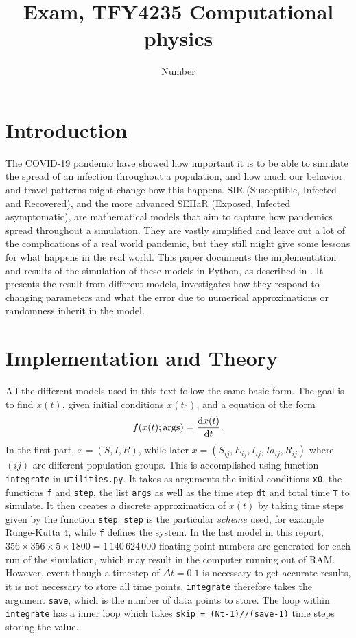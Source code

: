 \documentclass{article}
\title{Exam, TFY4235 Computational physics}
\author{Number}
\date{}
\begin{document}
    \maketitle
    \section*{Introduction}
    The COVID-19 pandemic have showed how important it is to be able to simulate the spread of an infection throughout a population, and how much our behavior and travel patterns might change how this happens.
    SIR (Susceptible, Infected and Recovered), and the more advanced SEIIaR (Exposed, Infected asymptomatic), are mathematical models that aim to capture how pandemics spread throughout a simulation.
    They are vastly simplified and leave out a lot of the complications of a real world pandemic, but they still might give some lessons for what happens in the real world.
    This paper documents the implementation and results of the simulation of these models in Python, as described in \cite{exam}.
    It presents the result from different models, investigates how they respond to changing parameters and what the error due to numerical approximations or randomness inherit in the model.

    \section*{Implementation and Theory}
    All the different models used in this text follow the same basic form. 
    The goal is to find $x(t)$, given initial conditions $x(t_0)$, and a equation of the form
    \begin{equation*}
        f(x(t); \mathrm{args}) = \dv{x(t)}{t}.
    \end{equation*}
    In the first part, $x = (S, I, R)$, while later $x = (S_{ij}, E_{ij}, I_{ij}, Ia_{ij}, R_{ij})$ where $(ij)$ are different population groups. 
    This is accomplished using function \verb|integrate| in \verb|utilities.py|. 
    It takes as arguments the initial conditions \verb|x0|, the functions \verb|f| and \verb|step|, the list \verb|args| as well as the time step \verb|dt| and total time \verb|T| to simulate. 
    It then creates a discrete approximation of $x(t)$ by taking time steps given by the function \verb|step|. 
    \verb|step| is the particular \emph{scheme} used, for example Runge-Kutta 4, while \verb|f| defines the system. In the last model in this report, $356\times356\times5\times1800=1\,140\,624\,000$ floating point numbers are generated for each run of the simulation, which may result in the computer running out of RAM.
    However, event though a timestep of $\Delta t = 0.1$ is necessary to get accurate results, it is not necessary to store all time points.
    \verb|integrate| therefore takes the argument \verb|save|, which is the number of data points to store.
    The loop within \verb|integrate| has a inner loop which takes \verb|skip = (Nt-1)//(save-1)| time steps storing the value.
    
\end{document}
